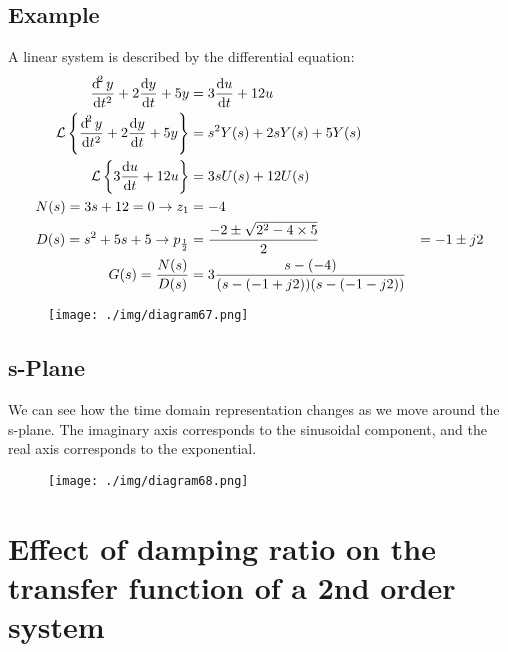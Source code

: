 \subsection{Example}
A linear system is described by the differential equation:
\begin{align}
  \frac{\dif^2 y}{\dif t^2} + 2 \frac{\dif y}{\dif t} + 5y                              & = 3 \frac{\dif u}{\dif t} + 12 u                       \\
  \mathcal{L} \left\{ \frac{\dif^2 y}{\dif t^2} + 2 \frac{\dif y}{\dif t} + 5y \right\} & = s^2 Y(s) + 2s Y(s) + 5Y(s)                           \\
  \mathcal{L} \left\{ 3 \frac{\dif u}{\dif t} + 12 u \right\}                           & = 3sU(s) + 12U(s)                                      \\
  N(s) = 3s + 12 = 0 \rightarrow z_1                                                    & = -4                                                   \\
  D(s) = s^2 + 5s + 5 \rightarrow p_{\frac{1}{2}}                                       & = \frac{-2\pm\sqrt{2^2 - 4\times 5}}{2}  & = -1 \pm j2 \\
  G(s) = \frac{N(s)}{D(s)}                                                              & = 3\frac{s-(-4)}{(s-(-1+j2))(s-(-1-j2))}
\end{align}
\begin{figure}[H]
  \centering
  \texttt{[image: ./img/diagram67.png]}
\end{figure}
\subsection{s-Plane}
We can see how the time domain representation changes as we move around the s-plane. The imaginary axis corresponds to the sinusoidal component, and the real axis corresponds to the exponential.
\begin{figure}[H]
  \centering
  \texttt{[image: ./img/diagram68.png]}
\end{figure}
\section{Effect of damping ratio on the transfer function of a 2nd order system}
